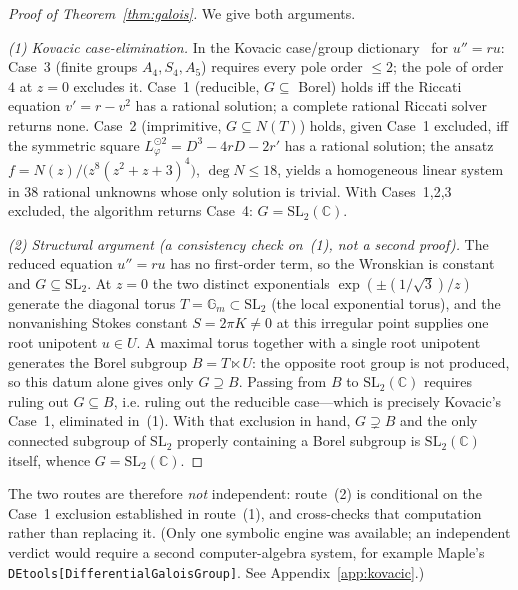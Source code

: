 \documentclass[11pt,reqno]{amsart}
\renewcommand{\_}{\vquadorigunderscore\allowbreak}
\theoremstyle{plain}
\theoremstyle{definition}
\newcommand{\Lphi}{L_{\varphi}}
\newcommand{\SL}{\mathrm{SL}}
\begin{document}
\begin{proof}[Proof of Theorem~\ref{thm:galois}]
We give both arguments.

\emph{(1) Kovacic case-elimination.} In the Kovacic case/group
dictionary~\cite{Kovacic,vdPS} for $u''=ru$: Case~3 (finite groups $A_4,S_4,A_5$) requires every
pole order $\le2$; the pole of order $4$ at $z=0$ excludes it. Case~1 (reducible, $G\subseteq$
Borel) holds iff the Riccati equation $v'=r-v^2$ has a rational solution; a complete rational
Riccati solver returns none. Case~2 (imprimitive, $G\subseteq N(T)$) holds, given Case~1
excluded, iff the symmetric square $\Lphi^{\odot2}=D^3-4rD-2r'$ has a rational solution; the
ansatz $f=N(z)/\bigl(z^8(z^2+z+3)^4\bigr)$, $\deg N\le18$, yields a homogeneous linear system in
$38$ rational unknowns whose only solution is trivial. With Cases~1,2,3 excluded, the algorithm
returns Case~4: $G=\SL_2(\mathbb{C})$.

\emph{(2) Structural argument (a consistency check on~(1), not a second proof).} The reduced
equation $u''=ru$ has no first-order term, so the Wronskian is constant and $G\subseteq\SL_2$.
At $z=0$ the two distinct exponentials $\exp(\pm(1/\sqrt3)/z)$ generate the diagonal torus
$T=\mathbb{G}_m\subset\SL_2$ (the local exponential torus), and the nonvanishing Stokes constant
$S=2\pi K\ne0$ at this irregular point supplies one root unipotent $u\in U$. A maximal torus
together with a single root unipotent generates the Borel subgroup $B=T\ltimes U$: the opposite
root group is not produced, so this datum alone gives only $G\supseteq B$. Passing from $B$ to
$\SL_2(\mathbb{C})$ requires ruling out $G\subseteq B$, i.e. ruling out the reducible case---which
is precisely Kovacic's Case~1, eliminated in~(1). With that exclusion in hand, $G\supsetneq B$
and the only connected subgroup of $\SL_2$ properly containing a Borel subgroup is
$\SL_2(\mathbb{C})$ itself, whence $G=\SL_2(\mathbb{C})$.
\end{proof}

The two routes are therefore \emph{not} independent: route~(2) is conditional on the Case~1
exclusion established in route~(1), and cross-checks that computation rather than replacing it.
(Only one symbolic engine was available; an independent verdict would require a second
computer-algebra system, for example Maple's \texttt{DEtools[DifferentialGaloisGroup]}. See
Appendix~\ref{app:kovacic}.)
\end{document}
